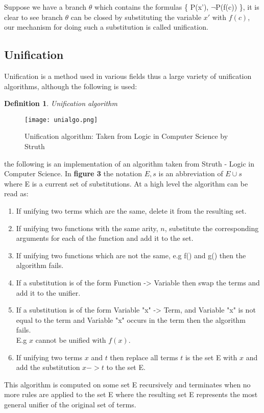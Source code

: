 \documentclass{article}%
\newtheorem{definition}{Definition}
\begin{document}
Suppose we have a branch $\theta$ which contains the formulas \{ P(x'), $\neg$P(f(c)) \}, it is clear to see branch $\theta$  can be closed by substituting the variable $x'$ with $f(c)$, our mechanism for doing such a substitution is called unification. 
\subsection{Unification}
Unification is a method used in various fields thus a large variety of unification algorithms, although the following is used:
\begin{definition}
Unification algorithm
\end{definition}
\begin{figure}[h!]
\centering
\texttt{[image: unialgo.png]}
\caption{Unification algorithm: Taken from Logic in Computer Science by Struth} \cite{struth_2019}
\label{fig:unification algorithm}
\end{figure}
the following is an implementation of an algorithm taken from Struth - Logic in Computer Science. \cite{struth_2019}
In \textbf{figure 3} the notation $E,s$ is an abbreviation of $E \cup s$ where E is a current set of substitutions.
At a high level the algorithm can be read as: 
\begin{enumerate}
\item If unifying two terms which are the same, delete it from the resulting set. 
\item If unifying two functions with the same arity, $n$, substitute the corresponding arguments for each of the function and add it to the set.
\item If unifying two functions which are not the same, e.g f() and g() then the algorithm fails.
\item If a substitution is of the form Function -> Variable then swap the terms and add it to the unifier.
\item If a substitution is of the form Variable "x" -> Term, and Variable "x" is not equal to the term and Variable "x" occurs in the term then the algorithm fails. \\
E.g $x$ cannot be unified with $f(x)$. 
\item If unifying two terms $x$ and $t$ then replace all terms $t$ is the set E with $x$ and add the substitution $x -> t$ to the set E. 
\end{enumerate}
This algorithm is computed on some set E recursively and terminates when no more rules are applied to the set E where the resulting set E represents the most general unifier of the original set of terms. 
\end{document}
